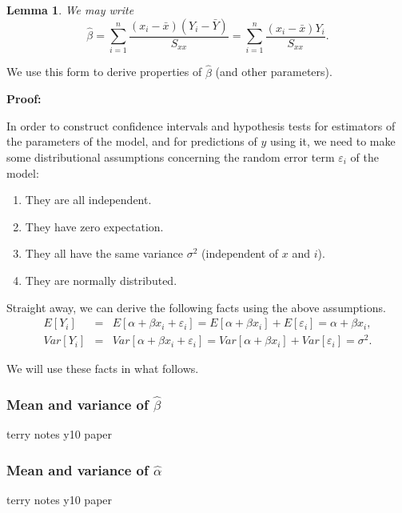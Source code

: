 \documentclass[12pt]{article}
\theoremstyle{break}
\newtheorem{lemma}[theorem]{Lemma}
\begin{document}
\begin{lemma}
  We may write
  $$
  \hat{\beta}=\sum_{i=1}^{n}\frac{(x_{i}-\bar{x})(Y_{i}-\bar{Y})}{S_{xx}}=\sum_{i=1}^{n}\frac{(x_{i}-\bar{x})Y_{i}}{S_{xx}}.
  $$
\end{lemma}
We use this form to derive properties of $\hat{\beta}$ (and other parameters).

\begin{mdframed}
{\bf Proof:}
\textcolor[rgb]{1.00,1.00,1.00}{\lipsum[1-3]}
\end{mdframed}

In order to construct confidence intervals and hypothesis tests for estimators of the parameters of the model, and for predictions of $y$ using it, we need to make some distributional assumptions concerning the random error term $\varepsilon_{i}$ of the model:
\begin{enumerate}
\item They are all independent.
\item They have zero expectation.
\item They all have the same variance $\sigma^{2}$ (independent of $x$ and $i$).
\item They are normally distributed.
\end{enumerate}

Straight away, we can derive the following facts using the above assumptions.
\begin{eqnarray*}
  E[Y_{i}] &=& E[\alpha+\beta x_{i} +\varepsilon_{i}]=E[\alpha+\beta x_{i}] +E[\varepsilon_{i}]=\alpha+\beta x_{i}, \\
   Var[Y_{i}] &=& Var[\alpha+\beta x_{i} +\varepsilon_{i}]=Var[\alpha+\beta x_{i}] +Var[\varepsilon_{i}]=\sigma^{2}.
\end{eqnarray*}


We will use these facts in what follows.
\newpage
\subsubsection{Mean and variance of $\hat{\beta}$}

\begin{mdframed}
\textcolor[rgb]{1.00,1.00,1.00}{terry notes y10 paper\lipsum[1-4]}
\end{mdframed}

\subsubsection{Mean and variance of $\hat{\alpha}$}
\begin{mdframed}
\textcolor[rgb]{1.00,1.00,1.00}{terry notes y10 paper\lipsum[1-4]}
\end{mdframed}
\end{document}
